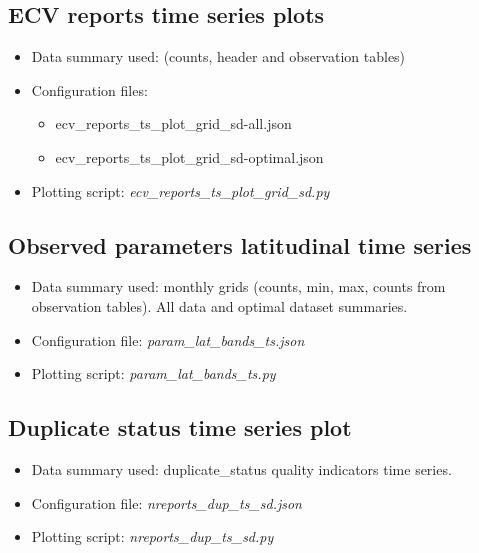 \documentclass[letterpaper,10pt,english]{sphinxmanual}
\begin{document}
\subsection{ECV reports time series plots}
\label{\detokenize{index:ecv-reports-time-series-plots}}\begin{itemize}
\item {} 
Data summary used: {\hyperref[\detokenize{index:monthly-grids-sd-section}]{}} (counts, header and observation tables)

\item {} 
Configuration files:
\begin{itemize}
\item {} 
ecv\_reports\_ts\_plot\_grid\_sd-all.json
\item {} 
ecv\_reports\_ts\_plot\_grid\_sd-optimal.json
\end{itemize}
\item {} 
 Plotting script: \textit{ecv\_reports\_ts\_plot\_grid\_sd.py}

\end{itemize}


\subsection{Observed parameters latitudinal time series}
\label{\detokenize{index:observed-parameters-latitudinal-time-series}}\begin{itemize}
\item {} 
Data summary used: monthly grids (counts, min, max, counts from observation tables). All data and optimal dataset summaries.

\item {} 
Configuration file: \textit{param\_lat\_bands\_ts.json}

\item {} 
 Plotting script: \textit{param\_lat\_bands\_ts.py}
 
\end{itemize}


\subsection{Duplicate status time series plot}
\label{\detokenize{index:id6}}\begin{itemize}
\item {} 
Data summary used: duplicate\_status quality indicators time series.

\item {} 
Configuration file: \textit{nreports\_dup\_ts\_sd.json}
\item {} 
 Plotting script: \textit{nreports\_dup\_ts\_sd.py}

\end{itemize}
\end{document}
